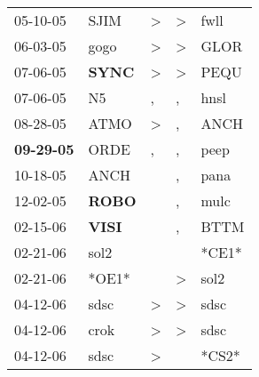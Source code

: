 \begin{supertabular}{p{0.07\textwidth}p{0.06\textwidth}p{0.02\textwidth}p{0.02\textwidth}p{0.06\textwidth}}
          05-10-05\textsuperscript{} &           SJIM\textsuperscript{} &     \textgreater &     \textgreater &           fwll\textsuperscript{} \\
          06-03-05\textsuperscript{} &           gogo\textsuperscript{} &     \textgreater &     \textgreater &           GLOR\textsuperscript{} \\
          07-06-05\textsuperscript{} &  \textbf{SYNC\textsuperscript{}} &     \textgreater &     \textgreater &           PEQU\textsuperscript{} \\
          07-06-05\textsuperscript{} &             N5\textsuperscript{} &                , &                , &           hnsl\textsuperscript{} \\
          08-28-05\textsuperscript{} &           ATMO\textsuperscript{} &     \textgreater &                , &           ANCH\textsuperscript{} \\
 \textbf{09-29-05\textsuperscript{}} &           ORDE\textsuperscript{} &                , &                , &           peep\textsuperscript{} \\
          10-18-05\textsuperscript{} &           ANCH\textsuperscript{} &                  &                , &           pana\textsuperscript{} \\
          12-02-05\textsuperscript{} &  \textbf{ROBO\textsuperscript{}} &                  &                , &           mulc\textsuperscript{} \\
          02-15-06\textsuperscript{} &  \textbf{VISI\textsuperscript{}} &                  &                , &           BTTM\textsuperscript{} \\
          02-21-06\textsuperscript{} &           sol2\textsuperscript{} &                  &                  &                            *CE1* \\
          02-21-06\textsuperscript{} &                            *OE1* &                  &     \textgreater &           sol2\textsuperscript{} \\
          04-12-06\textsuperscript{} &           sdsc\textsuperscript{} &     \textgreater &     \textgreater &           sdsc\textsuperscript{} \\
          04-12-06\textsuperscript{} &           crok\textsuperscript{} &     \textgreater &     \textgreater &           sdsc\textsuperscript{} \\
          04-12-06\textsuperscript{} &           sdsc\textsuperscript{} &     \textgreater &                  &                            *CS2* \\

\end{supertabular}
